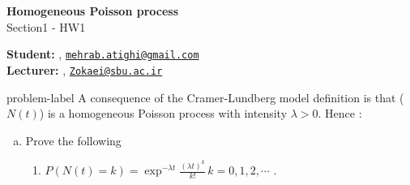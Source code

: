 	






		\begin{Large}
		\textsf{\textbf{Homogeneous Poisson process}}\\
		Section1 - HW1
	\end{Large}
	
	\vspace{1ex}
	
	\textsf{\textbf{Student:}} , \href{mailto:mehrab.atighi@gmail.com}{\texttt{mehrab.atighi@gmail.com}}\\
	\textsf{\textbf{Lecturer:}} , \href{mailto:Zokaei@sbu.ac.ir}{\texttt{Zokaei@sbu.ac.ir}}
	
	
	\vspace{2ex}
	
	\begin{problem}{}{problem-label}
		A consequence of the Cramer-Lundberg model definition is that ($N(t)$) is a homogeneous Poisson process with intensity $\lambda > 0$. Hence \cite{Embrechts.etal1997}:
		
		\begin{enumerate}[(a)]
			\item Prove the following
			\begin{enumerate}[label = (\roman*)]
				\item $P(N(t) =k) = \exp^{-\lambda t} \frac{(\lambda t)^k}{k!} \, k = 0,1,2,\cdots$ .
			\end{enumerate}
		\end{enumerate}
	\end{problem}
	
